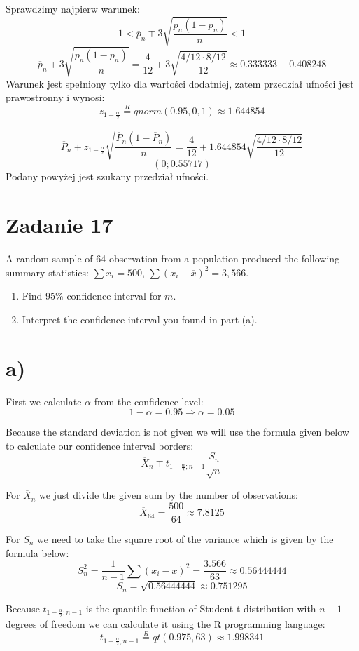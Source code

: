 \documentclass{article}
\begin{document}
Sprawdzimy najpierw warunek:
\[ 1 < \overline{p}_n \mp 3\sqrt{\frac{\overline{p}_n(1-\overline{p}_n) }{n}} < 1 \]
\[ \overline{p}_n \mp 3\sqrt{\frac{\overline{p}_n(1-\overline{p}_n)}{n} } = \frac{4}{12} \mp 3\sqrt{\frac{4/12\cdot 8/12}{12}} \approx 0.333333 \mp 0.408248 \]
Warunek jest spełniony tylko dla wartości dodatniej, zatem przedział ufności jest prawostronny i wynosi:
\[ z_{1-\frac{\alpha}{2}} \overset{R}{=} qnorm(0.95, 0 ,1) \approx 1.644854\]

\[ \overline{P}_n + z_{1-\frac{\alpha}{2}} \sqrt{\frac{\overline{P}_n(1-\overline{P}_n) }{n}} = \frac{4}{12} + 1.644854 \sqrt{\frac{4/12\cdot 8/12}{12}}\]
\[ (0 ; 0.55717) \]
Podany powyżej jest szukany przedział ufności.

\newpage
\section{Zadanie 17}
A random sample of 64 observation from a population produced the following summary statistics: $\sum x_i=500$, $\sum(x_i-\overline{x})^2=3,566$.
\begin{enumerate}[label = \alph*)]
\item Find 95\% confidence interval for $m$.
\item Interpret the confidence interval you found in part (a).
\end{enumerate}

\section{a)}
First we calculate $\alpha$ from the confidence level:
\[ 1 - \alpha = 0.95 \Rightarrow \alpha = 0.05 \]

Because the standard deviation is not given we will use the formula given below to calculate our confidence interval borders:
\[ \overline{X}_n \mp t_{1-\frac{\alpha}{2};n-1} \frac{S_n}{\sqrt{n}} \]

For $\overline{X}_n$ we just divide the given sum by the number of observations:
\[ \overline{X}_64 = \frac{500}{64} \approx 7.8125 \]

For $S_n$ we need to take the square root of the variance which is given by the formula below:
\[ S_n^2 = \frac{1}{n-1}\sum(x_i-\overline{x})^2 = \frac{3.566}{63} \approx 0.56444444 \]
\[ S_n = \sqrt{0.56444444} \approx 0.751295 \]

Because $ t_{1-\frac{\alpha}{2};n-1}$ is the quantile function of Student-t distribution with $n-1$ degrees of freedom we can calculate it using the R programming language:
\[  t_{1-\frac{\alpha}{2};n-1} \overset{R}{=} qt(0.975, 63) \approx 1.998341 \]
\end{document}

